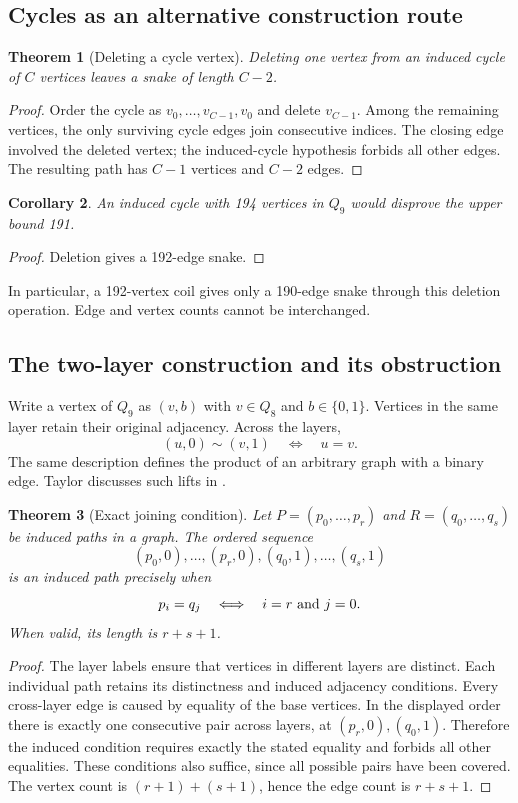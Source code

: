 \documentclass[11pt,a4paper]{article}
\newtheorem{theorem}{Theorem}[section]
\newtheorem{corollary}[theorem]{Corollary}
\theoremstyle{definition}
\theoremstyle{remark}
\newcommand{\Q}{Q}
\begin{document}
\subsection{Cycles as an alternative construction route}
\begin{theorem}[Deleting a cycle vertex]
Deleting one vertex from an induced cycle of $C$ vertices leaves a snake of length $C-2$.
\end{theorem}
\begin{proof}
Order the cycle as $v_0,\ldots,v_{C-1},v_0$ and delete $v_{C-1}$. Among the remaining vertices, the only surviving cycle edges join consecutive indices. The closing edge involved the deleted vertex; the induced-cycle hypothesis forbids all other edges. The resulting path has $C-1$ vertices and $C-2$ edges.
\end{proof}
\begin{corollary}
An induced cycle with 194 vertices in $\Q_9$ would disprove the upper bound 191.
\end{corollary}
\begin{proof}
Deletion gives a 192-edge snake.
\end{proof}
In particular, a 192-vertex coil gives only a 190-edge snake through this deletion operation. Edge and vertex counts cannot be interchanged.

\subsection{The two-layer construction and its obstruction}
Write a vertex of $\Q_9$ as $(v,b)$ with $v\in\Q_8$ and $b\in\{0,1\}$. Vertices in the same layer retain their original adjacency. Across the layers,
\[
(u,0)\sim(v,1)\quad\Longleftrightarrow\quad u=v.
\]
The same description defines the product of an arbitrary graph with a binary edge. Taylor discusses such lifts in \cite{taylor}.

\begin{theorem}[Exact joining condition]\label{thm:join}
Let $P=(p_0,\ldots,p_r)$ and $R=(q_0,\ldots,q_s)$ be induced paths in a graph. The ordered sequence
\[
(p_0,0),\ldots,(p_r,0),(q_0,1),\ldots,(q_s,1)
\]
is an induced path precisely when
\[
p_i=q_j\quad\Longleftrightarrow\quad i=r\ \hbox{and}\ j=0.
\]
When valid, its length is $r+s+1$.
\end{theorem}
\begin{proof}
The layer labels ensure that vertices in different layers are distinct. Each individual path retains its distinctness and induced adjacency conditions. Every cross-layer edge is caused by equality of the base vertices. In the displayed order there is exactly one consecutive pair across layers, at $(p_r,0),(q_0,1)$. Therefore the induced condition requires exactly the stated equality and forbids all other equalities. These conditions also suffice, since all possible pairs have been covered. The vertex count is $(r+1)+(s+1)$, hence the edge count is $r+s+1$.
\end{proof}
\end{document}
